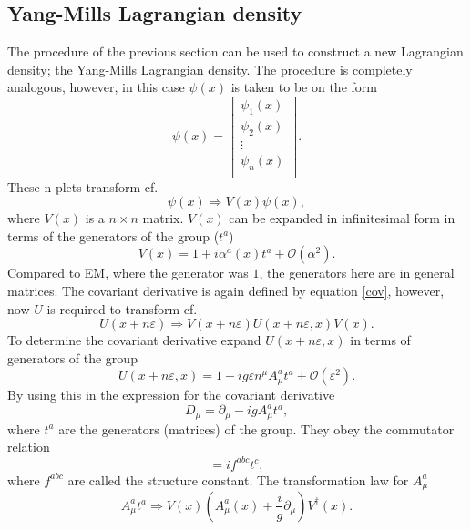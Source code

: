 \subsection*{Yang-Mills Lagrangian density}
The procedure of the previous section can be used to construct a new Lagrangian density; the Yang-Mills Lagrangian density. The procedure is completely analogous, however, in this case $\psi(x)$ is taken to be on the form
\begin{equation}
	\psi(x)=\begin{bmatrix}
		\psi_1(x)\\
		\psi_2(x)\\
		\vdots\\
		\psi_n(x)\\
	\end{bmatrix}.
\end{equation}  
These n-plets transform cf.
\begin{equation}
	\psi(x)\Rightarrow V(x)\psi(x),
\end{equation}  
where $V(x)$ is a $n\times n$ matrix. $V(x)$ can be expanded in infinitesimal form in terms of the generators of the group ($t^a$)
\begin{equation}
	V(x)=1+i\alpha^a(x)t^a+\mathcal{O}(\alpha^2).
\end{equation} 
Compared to EM, where the generator was $1$, the generators here are in general matrices. The covariant derivative is again defined by equation \eqref{cov}, however, now $U$ is required to transform cf.
\begin{equation}
	U(x+n\varepsilon)\Rightarrow V(x+n\varepsilon)U(x+n\varepsilon,x)V(x).
\end{equation} 
To determine the covariant derivative expand $U(x+n\varepsilon,x)$ in terms of generators of the group
\begin{equation}
	U(x+n\varepsilon,x)=1+ig\varepsilon n^\mu A_\mu^at^a+\mathcal{O}(\varepsilon^2).
\end{equation} 
By using this in the expression for the covariant derivative
\begin{equation}
	D_\mu=\partial_\mu-igA_\mu^at^a,
\end{equation} 
where $t^a$ are the generators (matrices) of the group. They obey the commutator relation
\begin{equation}
	[t^a,t^b]=if^{abc}t^c,
\end{equation} 
where $f^{abc}$ are called the structure constant. The transformation law for $A_\mu^a$
\begin{equation}
	A_\mu^at^a\Rightarrow V(x)(A_\mu^a(x)+\frac{i}{g}\partial_\mu)V^\dagger(x).
\end{equation} 
